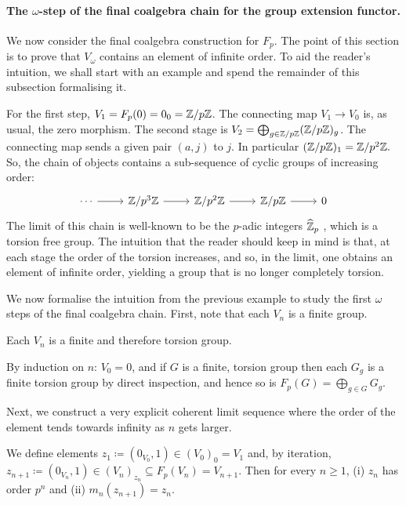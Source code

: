\documentclass[runningheads]{llncs}
\begin{document}
\paragraph*{The $\omega$-step of the final coalgebra chain for the group extension functor.}
We now consider the final coalgebra construction for $F_p$. The point of this section is to prove that $V_\omega$ contains an element of infinite order. To aid the reader's intuition, we shall start with an example and spend the remainder of this subsection formalising it.
\begin{example}
For the first step, $V_1 = F_p(0) = 0_0 = \mathbb{Z}/p\mathbb{Z}$. The connecting map $V_1 \to V_0$ is, as usual, the zero morphism.
The second stage is $V_2 = \bigoplus_{g \in \mathbb{Z}/p\mathbb{Z}} (\mathbb{Z}/p\mathbb{Z})_g$. The connecting map sends a given pair $(a, j)$ to $j$. In particular $(\mathbb{Z}/p\mathbb{Z})_1 = \mathbb{Z}/p^2\mathbb{Z}.$
So, the chain of objects contains a sub-sequence of cyclic groups of increasing order:
\begin{equation*}
\begin{tikzcd}
\cdots \rar& \Z/ p^3\Z  \rar &   \Z/ p^2\Z \rar & \Z/ p\Z \rar  & 0 
 \end{tikzcd}
\end{equation*}
The limit of this chain is well-known to be the $p$-adic integers $\widehat{\mathbb{Z}}_p$ \cite[Section 7.1]{eisenbud95}, which is a torsion free group.
The intuition that the reader should keep in mind is that, at each stage the order of the torsion increases, and so, in the limit, one obtains an element of infinite order, yielding a group that is no longer completely torsion.
\end{example}
We now formalise the intuition from the previous example to study the first $\omega$ steps of the final coalgebra chain.
 First, note that each $V_n$ is a finite group.
\begin{lemmaE}
\label{lem:stages-torsion}
Each $V_n$ is a finite and therefore torsion group.
\end{lemmaE}
\begin{proofE}
By induction on $n$: $V_0 = 0$, and if $G$ is a finite, torsion group then each $G_g $ is a finite torsion group by direct inspection, and hence so is $F_p(G) = \bigoplus_{g\in G} G_g$.
\end{proofE}
Next, we construct a very explicit coherent limit sequence where the order of the element tends towards infinity as $n$ gets larger.
\begin{lemmaE}
\label{lem:tracked}
We define elements $z_1 \coloneqq (0_{V_0},1) \in (V_0)_0 = V_1$ and, by iteration, $z_{n+1} \coloneqq (0_{V_n},1) \in (V_n)_{z_n} \subseteq F_p(V_n) = V_{n+1}$.
Then for every $n\ge 1$, 
(i) $z_n$ has order $p^n$ and 
(ii) $m_n(z_{n+1}) = z_n$.
\end{lemmaE}
\end{document}
